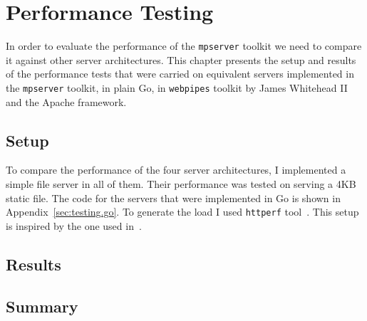 \section{Performance Testing}
\label{sec:test}
In order to evaluate the performance of the \texttt{mpserver} toolkit we 
need to compare it against other server architectures.
This chapter presents the setup and results of the performance tests
that were carried on equivalent servers implemented in the \texttt{mpserver} toolkit,
in plain Go, in \texttt{webpipes} toolkit by James Whitehead II~\cite{whitehead} 
and the Apache framework.

\subsection{Setup}
To compare the performance of the four server architectures, I 
implemented a simple file server in all of them. Their performance 
was tested on serving a 4KB static file. The code for the servers 
that were implemented in Go is shown in Appendix~\ref{sec:testing.go}. To generate 
the load I used \texttt{httperf} tool~\cite{httperf}. This setup
is inspired by the one used in~\cite{whitehead}.


\subsection{Results}

\subsection{Summary}

